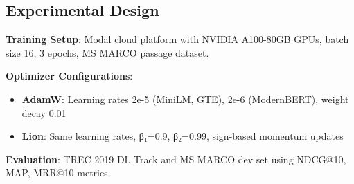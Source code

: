 \subsection{Experimental Design}
\textbf{Training Setup}: Modal cloud platform with NVIDIA A100-80GB GPUs, batch size 16, 3 epochs, MS MARCO passage dataset.

\textbf{Optimizer Configurations}:
\begin{itemize}
    \item \textbf{AdamW}: Learning rates 2e-5 (MiniLM, GTE), 2e-6 (ModernBERT), weight decay 0.01
    \item \textbf{Lion}: Same learning rates, β₁=0.9, β₂=0.99, sign-based momentum updates
\end{itemize}

\textbf{Evaluation}: TREC 2019 DL Track and MS MARCO dev set using NDCG@10, MAP, MRR@10 metrics.


